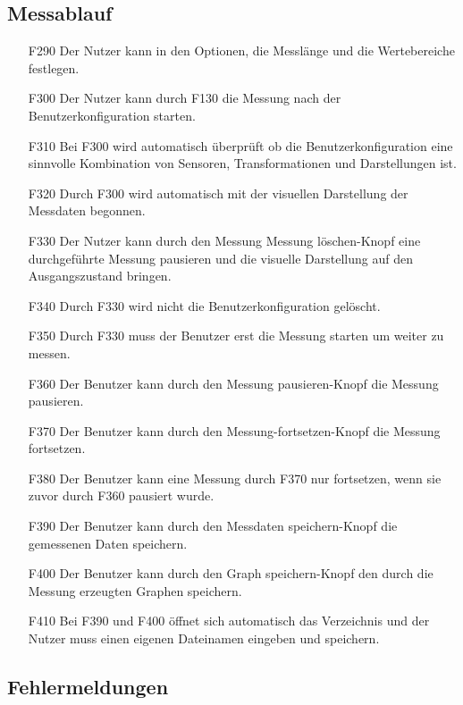 \documentclass[parskip=full]{scrartcl}
\begin{document}
\subsection{Messablauf}

\begin{itemize}

\item[F290] Der Nutzer kann in den Optionen, die Messlänge und die Wertebereiche festlegen.
\item[F300] Der Nutzer kann durch F130 die Messung nach der \gls{Benutzerkonfiguration} starten.
\item[F310] Bei F300 wird automatisch überprüft ob die Benutzerkonfiguration eine sinnvolle Kombination von Sensoren, Transformationen und Darstellungen ist.
\item[F320] Durch F300 wird automatisch mit der visuellen Darstellung der Messdaten begonnen.
\item[F330] Der Nutzer kann durch den Messung Messung löschen-Knopf eine durchgeführte Messung pausieren und die visuelle Darstellung auf den Ausgangszustand bringen.
\item[F340] Durch F330 wird nicht die \gls{Benutzerkonfiguration} gelöscht.
\item[F350] Durch F330 muss der Benutzer erst die Messung starten um weiter zu messen.
\item[F360] Der Benutzer kann durch den Messung pausieren-Knopf die Messung pausieren.
\item[F370] Der Benutzer kann durch den Messung-fortsetzen-Knopf die Messung fortsetzen.
\item[F380] Der Benutzer kann eine Messung durch F370 nur fortsetzen, wenn sie zuvor durch F360 pausiert wurde.
\item[F390] Der Benutzer kann durch den Messdaten speichern-Knopf die gemessenen Daten speichern.
\item[F400] Der Benutzer kann durch den Graph speichern-Knopf den durch die Messung erzeugten Graphen speichern.
\item[F410] Bei F390 und F400 öffnet sich automatisch das Verzeichnis und der Nutzer muss einen eigenen Dateinamen eingeben und speichern. 



\end{itemize}

\subsection{Fehlermeldungen}
\end{document}
